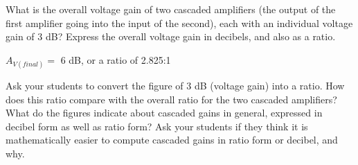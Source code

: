 

What is the overall voltage gain of two cascaded amplifiers (the output of the first amplifier going into the input of the second), each with an individual voltage gain of 3 dB?  Express the overall voltage gain in decibels, and also as a ratio.







$A_{V(final)} =$ 6 dB, or a ratio of 2.825:1







Ask your students to convert the figure of 3 dB (voltage gain) into a ratio.  How does this ratio compare with the overall ratio for the two cascaded amplifiers?  What do the figures indicate about cascaded gains in general, expressed in decibel form as well as ratio form?  Ask your students if they think it is mathematically easier to compute cascaded gains in ratio form or decibel, and why.




